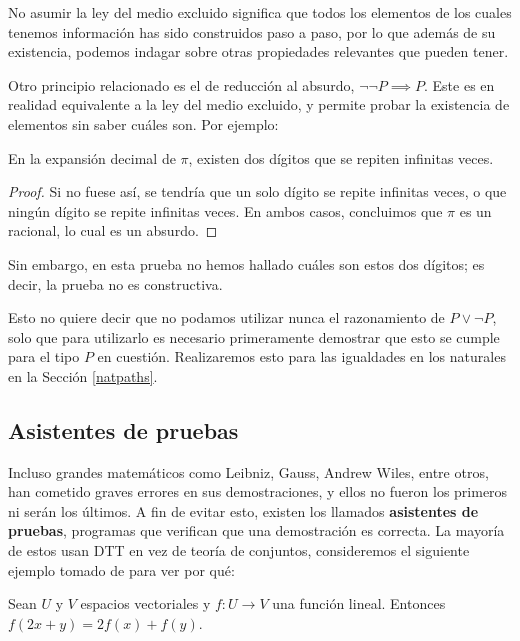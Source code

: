 \documentclass[../main.tex]{subfiles}
\begin{document}
No asumir la ley del medio excluido significa que todos los elementos de los cuales tenemos informaci\'on has sido construidos paso a paso, por lo que adem\'as de su existencia, podemos indagar sobre otras propiedades relevantes que pueden tener.

Otro principio relacionado es el de reducci\'on al absurdo, $\neg \neg P \implies P$.
Este es en realidad equivalente a la ley del medio excluido, y permite probar la existencia de elementos sin saber cu\'ales son. Por ejemplo:

\begin{proposition}
    En la expansi\'on decimal de $\pi$, existen dos d\'igitos que se repiten infinitas veces.
\end{proposition}

\begin{proof}
    Si no fuese as\'i, se tendr\'ia que un solo d\'igito se repite infinitas veces, o que ning\'un d\'igito se repite infinitas veces. En ambos casos, concluimos que $\pi$ es un racional, lo cual es un absurdo.
\end{proof}

Sin embargo, en esta prueba no hemos hallado cu\'ales son estos dos d\'igitos; es decir, la prueba no es constructiva.

Esto no quiere decir que no podamos utilizar nunca el razonamiento de $P \vee \lnot P$, solo que para utilizarlo es necesario primeramente demostrar que esto se cumple para el tipo $P$ en cuesti\'on. Realizaremos esto para las igualdades en los naturales en la Secci\'on \ref{natpaths}.

\subsection*{Asistentes de pruebas}

Incluso grandes matemáticos como Leibniz, Gauss, Andrew Wiles, entre otros, han cometido graves errores en sus demostraciones, y ellos no fueron los primeros ni ser\'an los \'ultimos.
A fin de evitar esto, existen los llamados \textbf{asistentes de pruebas}, programas que verifican que una demostración es correcta.
La mayor\'ia de estos usan DTT en vez de teor\'ia de conjuntos, consideremos el siguiente ejemplo tomado de \cite{376973} para ver por qu\'e:

\begin{proposition}
    Sean $U$ y $V$ espacios vectoriales y $f:U \to V$ una función lineal. Entonces $f(2x+y)=2f(x)+f(y)$.
\end{proposition}
\end{document}
